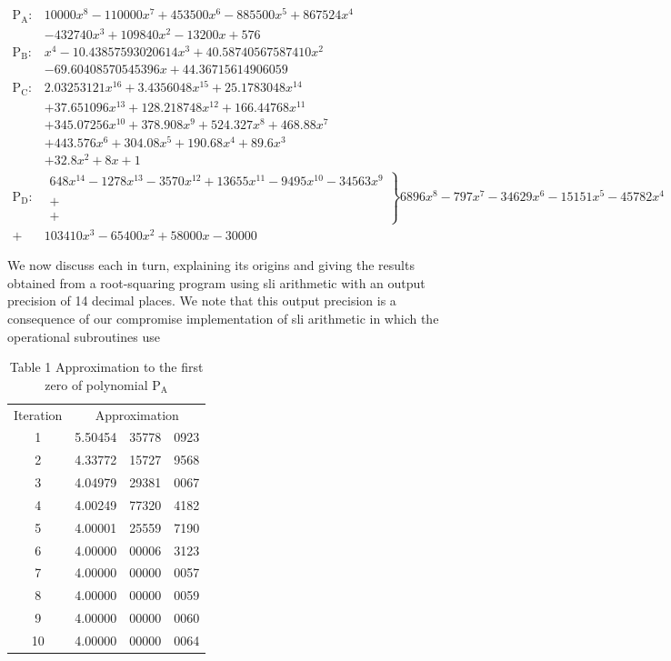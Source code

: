 \documentclass[10pt]{article}
\begin{document}
$$
\begin{array}{ll}
\mathrm{P}_{\mathrm{A}}: & 10000 x^{8}-110000 x^{7}+453500 x^{6}-885500 x^{5}+867524 x^{4} \\
& -432740 x^{3}+109840 x^{2}-13200 x+576 \\
\mathrm{P}_{\mathrm{B}}: & x^{4}-10.43857593020614 x^{3}+40.58740567587410 x^{2} \\
& -69.60408570545396 x+44.36715614906059 \\
\mathrm{P}_{\mathrm{C}}: & 2.03253121 x^{16}+3.4356048 x^{15}+25.1783048 x^{14} \\
& +37.651096 x^{13}+128.218748 x^{12}+166.44768 x^{11} \\
& +345.07256 x^{10}+378.908 x^{9}+524.327 x^{8}+468.88 x^{7} \\
& +443.576 x^{6}+304.08 x^{5}+190.68 x^{4}+89.6 x^{3} \\
& +32.8 x^{2}+8 x+1 \\
\mathrm{P}_{\mathrm{D}}: & \left.\begin{array}{l}
648 x^{14}-1278 x^{13}-3570 x^{12}+13655 x^{11}-9495 x^{10}-34563 x^{9} \\
\\
+ \\
+
\end{array}\right\} 6896 x^{8}-797 x^{7}-34629 x^{6}-15151 x^{5}-45782 x^{4} \\
+ & 103410 x^{3}-65400 x^{2}+58000 x-30000
\end{array}
$$

We now discuss each in turn, explaining its origins and giving the results obtained from a root-squaring program using sli arithmetic with an output precision of 14 decimal places. We note that this output precision is a consequence of our compromise implementation of sli arithmetic in which the operational subroutines use

\begin{table}[h]
\begin{center}
\captionsetup{labelformat=empty}
\caption{Table 1 Approximation to the first zero of polynomial $\mathrm{P}_{\mathrm{A}}$}
\begin{tabular}{cccc}
Iteration & \multicolumn{3}{c}{Approximation} \\
1 & 5.50454 & 35778 & 0923 \\
2 & 4.33772 & 15727 & 9568 \\
3 & 4.04979 & 29381 & 0067 \\
4 & 4.00249 & 77320 & 4182 \\
5 & 4.00001 & 25559 & 7190 \\
6 & 4.00000 & 00006 & 3123 \\
7 & 4.00000 & 00000 & 0057 \\
8 & 4.00000 & 00000 & 0059 \\
9 & 4.00000 & 00000 & 0060 \\
10 & 4.00000 & 00000 & 0064 \\
\end{tabular}
\end{center}
\end{table}
\end{document}
